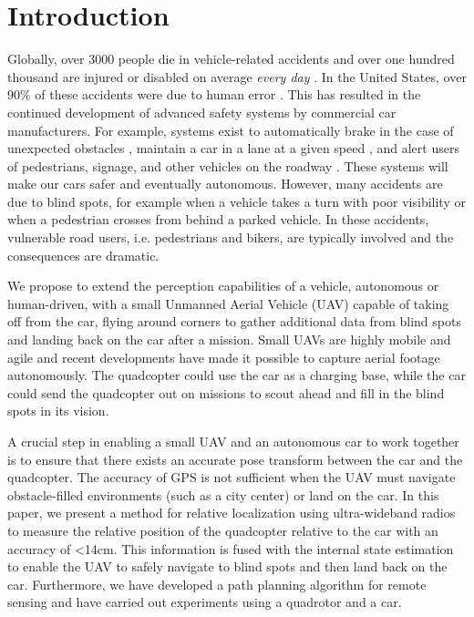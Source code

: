 
\section{Introduction}

%
%

Globally, over 3000 people die in vehicle-related accidents and over one hundred thousand are injured or disabled on average \emph{every day} \cite{ASIR2016}.
In the United States, over 90\% of these accidents were due to human error \cite{NHTSA_crash_stats}.
This has resulted in the continued development of advanced safety systems by commercial car manufacturers.
For example, systems exist to automatically brake in the case of unexpected obstacles \cite{Toyota_patent}, maintain a car in a lane at a given speed \cite{bradley2016tesla}, and alert users of pedestrians, signage, and other vehicles on the roadway \cite{Dagan_IVS_2004}. These systems will make our cars safer and eventually autonomous.
However, many accidents are due to blind spots, for example when a vehicle takes a turn with poor visibility or when a pedestrian crosses from behind a parked vehicle. In these accidents, vulnerable road users, i.e. pedestrians and bikers, are typically involved and the consequences are dramatic.

We propose to extend the perception capabilities of a vehicle, autonomous or human-driven, with a small Unmanned Aerial Vehicle (UAV) capable of taking off from the car, flying around corners to gather additional data from blind spots and landing back on the car after a mission. Small UAVs are highly mobile and agile and recent developments have made it possible to capture aerial footage autonomously\cite{naegeli17letters}.
The quadcopter could use the car as a charging base,
while the car could send the quadcopter out on missions to scout ahead and
fill in the blind spots in its vision.

A crucial step in enabling a small UAV and an autonomous car to work
together is to ensure that there exists an accurate pose transform between the car
and the quadcopter. The accuracy of GPS is not sufficient when the UAV must navigate
obstacle-filled environments (such as a city center) or land on the car. In this 
paper, we present a method for relative localization using ultra-wideband radios to measure the relative position of the quadcopter relative to the car with an accuracy of <14cm. This information is fused with the internal state estimation to enable the UAV to safely navigate to blind spots and then land back on the car. Furthermore, we have developed a path planning algorithm for remote sensing and have carried out experiments using a quadrotor and a car.

